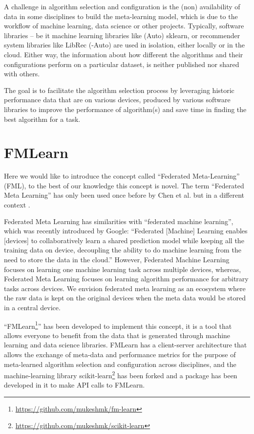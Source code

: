 \documentclass{article}
\begin{document}
A challenge in algorithm selection and configuration is the (non) availability of data in some disciplines to build the meta-learning model, which is due to the workflow of machine learning, data science or other projects. Typically, software libraries – be it machine learning libraries like (Auto) sklearn, or recommender system libraries like LibRec (-Auto) are used in isolation, either locally or in the cloud. Either way, the information about how different the algorithms and their configurations perform on a particular dataset, is neither published nor shared with others.

The goal is to facilitate the algorithm selection process by leveraging historic performance data that are on various devices, produced by various software libraries to improve the performance of algorithm(s) and save time in finding the best algorithm for a task.


\section{FMLearn}

Here we would like to introduce the concept called “Federated Meta-Learning” (FML), to the best of our knowledge this concept is novel. The term “Federated Meta Learning” has only been used once before by Chen et al. but in a different context \cite{chen-et-al}. 

Federated Meta Learning has similarities with “federated machine learning”, which was recently introduced by Google: “Federated [Machine] Learning enables [devices] to collaboratively learn a shared prediction model while keeping all the training data on device, decoupling the ability to do machine learning from the need to store the data in the cloud.”\cite{brendan-et-al} However, Federated Machine Learning focuses on learning one machine learning task across multiple devices, whereas, Federated Meta Learning focuses on learning algorithm performance for arbitrary tasks across devices. We envision federated meta learning as an ecosystem where the raw data is kept on the original devices when the meta data would be stored in a central device. 

“FMLearn\footnote{\url{https://github.com/mukeshmk/fm-learn}}” has been developed to implement this concept, it is a tool that allows everyone to benefit from the data that is generated through machine learning and data science libraries. FMLearn has a client-server architecture that allows the exchange of meta-data and performance metrics for the purpose of meta-learned algorithm selection and configuration across disciplines, and the machine-learning library scikit-learn\footnote{\url{https://github.com/mukeshmk/scikit-learn}} has been forked and a package has been developed in it to make API calls to FMLearn.
\end{document}
